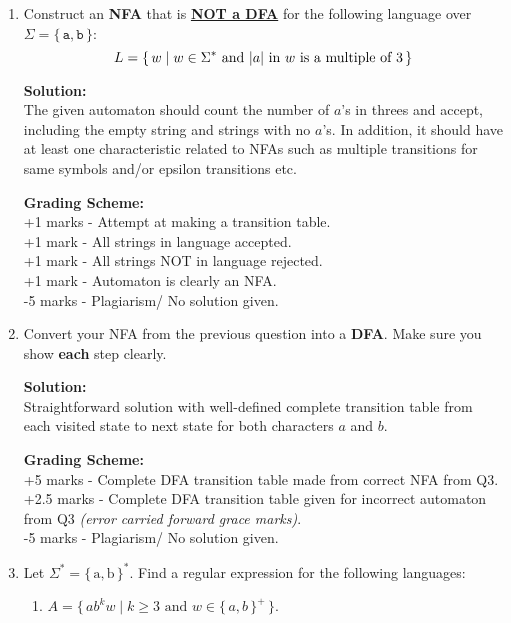 \documentclass[11pt, article, oneside]{memoir}
\newcommand{\set}[1]{\{\, #1\, \}}
\DeclarePairedDelimiter\abs{\lvert}{\rvert}
\begin{document}
\begin{enumerate}
    \item
        Construct an \textbf{NFA} that is \textbf{\underline{NOT a DFA}} for the following language over \(\Sigma = \set{\texttt{a}, \texttt{b}}\):
        \[
            L = \set{w \mid w \in \Sigma^* \text{ and }
            \text{\(\abs{a}\) in \(w\) is a multiple of \(3\)}}
        \]
        
        \textbf{Solution:}
        \\The given automaton should count the number of \(a\)'s in threes and accept, including the empty string and strings with no \(a\)'s. In addition, it should have at least one characteristic related to NFAs such as multiple transitions for same symbols and/or epsilon transitions etc.

        \textbf{Grading Scheme:}
        \\+1 marks - Attempt at making a transition table.
        \\+1 mark - All strings in language accepted.
        \\+1 mark - All strings NOT in language rejected.
        \\+1 mark - Automaton is clearly an NFA.
        \\-5 marks -  Plagiarism/ No solution given.
        
    \item
        Convert your NFA from the previous question into a \textbf{DFA}. Make sure you show \textbf{each} step clearly.

        \textbf{Solution:}
        \\Straightforward solution with well-defined complete transition table from each visited state to next state for both characters \(a\) and \(b\).

        \textbf{Grading Scheme:}
        \\+5 marks - Complete DFA transition table made from correct NFA from Q3.
        \\+2.5 marks - Complete DFA transition table given for incorrect automaton from Q3 \textit{(error carried forward grace marks)}.
        \\-5 marks -  Plagiarism/ No solution given.
        
    \item
        Let \(\Sigma^* = \set{\text{a}, \text{b}}^*\). Find a regular expression for the following languages:
        \begin{enumerate}
            \item
                \(A = \set{ab^kw \mid k \ge 3 \text{ and } w \in \set{a, b}^+}\).
        

\end{enumerate}
\end{enumerate}
\end{document}
